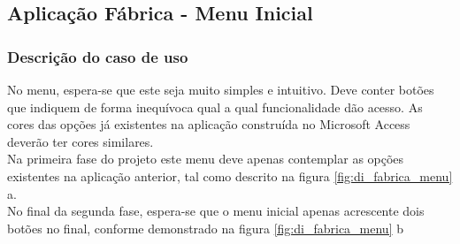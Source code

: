 \subsection{Aplicação Fábrica - Menu Inicial}
\subsubsection*{Descrição do caso de uso}
No menu, espera-se que este seja muito simples e intuitivo. Deve conter botões que indiquem de forma inequívoca qual a qual funcionalidade dão acesso. As cores das opções já existentes na aplicação construída no Microsoft Access deverão ter cores similares.\\
Na primeira fase do projeto este menu deve apenas contemplar as opções existentes na aplicação anterior, tal como descrito na figura \ref{fig:di_fabrica_menu} a.\\
No final da segunda fase, espera-se que o menu inicial apenas acrescente dois botões no final, conforme demonstrado na figura \ref{fig:di_fabrica_menu} b


